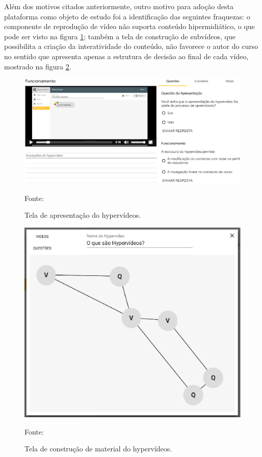 Além dos motivos citados anteriormente, outro motivo para adoção desta plataforma como objeto de estudo foi a identificação das seguintes fraquezas: o componente de reprodução de vídeo não suporta conteúdo hipermidiático, o que pode ser visto na figura \ref{fig:hyp_reprod}; também a tela de construção de subvídeos, que possibilita a criação da interatividade do conteúdo, não favorece o autor do curso no sentido que apresenta apenas a estrutura de decisão ao final de cada vídeo, mostrado na figura \ref{fig:hyp_constr}.

\begin{figure}[h!]
	\centering
  	\includegraphics[width=.9\linewidth]{figuras/reproducao_hyp.eps}
  	\caption{Tela de apresentação do hypervídeos.}
	\small{Fonte: \cite{arthurtcc}}
  	\label{fig:hyp_reprod}
\end{figure} 

\begin{figure}[h!]
	\centering
  	\includegraphics[width=.9\linewidth]{figuras/construcao_hyp.eps}
  	\caption{Tela de construção de material do hypervídeos.}
	\small{Fonte: \cite{arthurtcc}}
  	\label{fig:hyp_constr}
\end{figure} 


